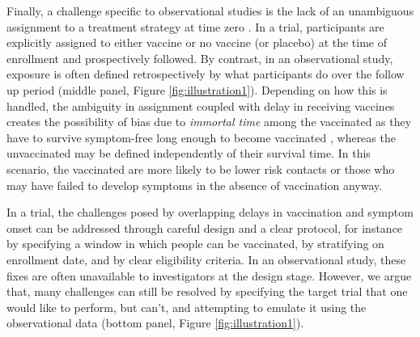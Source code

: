 \documentclass[11pt]{article}
\begin{document}
Finally, a challenge specific to observational studies is the lack of an unambiguous assignment to a treatment strategy at time zero \cite{hernan_how_2018}. In a trial, participants are explicitly assigned to either vaccine or no vaccine (or placebo) at the time of enrollment and prospectively followed. By contrast, in an observational study, exposure is often defined retrospectively by what participants do over the follow up period (middle panel, Figure \ref{fig:illustration1}). Depending on how this is handled, the ambiguity in assignment coupled with delay in receiving vaccines creates the possibility of bias due to \textit{immortal time} among the vaccinated as they have to survive symptom-free long enough to become vaccinated \cite{suissa_immortal_2008}, whereas the unvaccinated may be defined independently of their survival time. In this scenario, the vaccinated are more likely to be lower risk contacts or those who may have failed to develop symptoms in the absence of vaccination anyway. 

In a trial, the challenges posed by overlapping delays in vaccination and symptom onset can be addressed through careful design and a clear protocol, for instance by specifying a  window in which people can be vaccinated, by stratifying on enrollment date, and by clear eligibility criteria. In an observational study, these fixes are often unavailable to investigators at the design stage. However, we argue that, many challenges can still be resolved by specifying the target trial that one would like to perform, but can't, and attempting to emulate it using the observational data (bottom panel, Figure \ref{fig:illustration1}).
\end{document}
